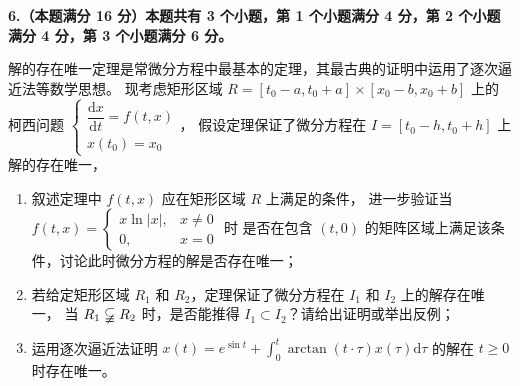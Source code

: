\textbf{6.（本题满分 16 分）本题共有 3 个小题，第 1 个小题满分 4 分，第 2 个小题满分 4 分，第 3 个小题满分 6 分。}

解的存在唯一定理是常微分方程中最基本的定理，其最古典的证明中运用了逐次逼近法等数学思想。
现考虑矩形区域 $R=[t_{0}-a,t_{0}+a] \times [x_{0}-b,x_{0}+b]$ 上的柯西问题 
$\begin{cases}\dfrac{\mathrm{d}x}{\mathrm{d}t}=f(t,x) \\ x(t_{0})=x_{0}\end{cases}$，
假设定理保证了微分方程在 $I=[t_{0}-h,t_{0}+h]$ 上解的存在唯一，
\begin{enumerate}[label=(\arabic*)]
\item 叙述定理中 $f(t,x)$ 应在矩形区域 $R$ 上满足的条件，
进一步验证当 $f(t,x)=\begin{cases}x \ln |x|, & x \neq 0 \\ 0, & x=0\end{cases}$ 时
是否在包含 $(t,0)$ 的矩阵区域上满足该条件，讨论此时微分方程的解是否存在唯一；
\item 若给定矩形区域 $R_{1}$ 和 $R_{2}$，定理保证了微分方程在 $I_{1}$ 和 $I_{2}$ 上的解存在唯一，
当 $R_{1} \varsubsetneqq R_{2}$ 时，是否能推得 $I_{1} \subset I_{2}$？请给出证明或举出反例；
\item 运用逐次逼近法证明 $\displaystyle x(t)=e^{\sin t}+\int_{0}^{t} \arctan (t\cdot\tau) x(\tau) \mathrm{d}\tau$ 的解在 $t \geq 0$ 时存在唯一。
\end{enumerate}
